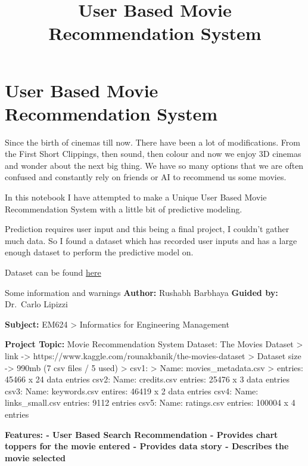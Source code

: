 \documentclass[11pt]{article}
\title{User Based Movie Recommendation System}
\begin{document}
    
    
    \maketitle
    
    

    
    \hypertarget{user-based-movie-recommendation-system}{%
\section{User Based Movie Recommendation
System}\label{user-based-movie-recommendation-system}}

    Since the birth of cinemas till now. There have been a lot of
modifications. From the First Short Clippings, then sound, then colour
and now we enjoy 3D cinemas and wonder about the next big thing. We have
so many options that we are often confused and constantly rely on
friends or AI to recommend us some movies.

    In this notebook I have attempted to make a Unique User Based Movie
Recommendation System with a little bit of predictive modeling.

    Prediction requires user input and this being a final project, I
couldn't gather much data. So I found a dataset which has recorded user
inputs and has a large enough dataset to perform the predictive model
on.

    Dataset can be found
\href{https://www.kaggle.com/rounakbanik/the-movies-dataset}{here}

    Some information and warnings \textbf{Author:} Rushabh Barbhaya
\textbf{Guided by:} Dr.~Carlo Lipizzi

\textbf{Subject:} EM624 \textgreater{} Informatics for Engineering
Management

\textbf{Project Topic:} Movie Recommendation System Dataset: The Movies
Dataset \textgreater{} link -\textgreater{}
https://www.kaggle.com/rounakbanik/the-movies-dataset \textgreater{}
Dataset size -\textgreater{} 990mb (7 csv files / 5 used) \textgreater{}
csv1: \textgreater{} Name: movies\_metadata.csv \textgreater{} entries:
45466 x 24 data entries csv2: Name: credits.csv entries: 25476 x 3 data
entries csv3: Name: keywords.csv entires: 46419 x 2 data entries csv4:
Name: links\_small.csv entries: 9112 entries csv5: Name: ratings.csv
entries: 100004 x 4 entries

\textbf{Features: - User Based Search Recommendation - Provides chart
toppers for the movie entered - Provides data story - Describes the
movie selected}
\end{document}
